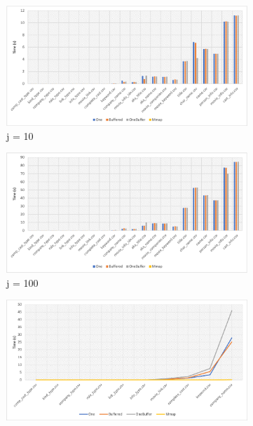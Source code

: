 \documentclass[12pt]{article}
\begin{document}
\begin{figure}[H] 
\begin{adjustwidth}{-3.5cm}{-3.5cm}
  \begin{subfigure}[b]{0.5\linewidth}
    \centering
    \includegraphics[width=0.99\linewidth]{images/randjump-10.png} 
    \caption{j = 10} 
    \label{fig:4a} 
    \vspace{4ex}
  \end{subfigure}%
  \begin{subfigure}[b]{0.5\linewidth}
    \centering
    \includegraphics[width=0.99\linewidth]{images/randjump-100.png} 
    \caption{j = 100} 
    \label{fig:4b} 
    \vspace{4ex}
  \end{subfigure} 
  \begin{subfigure}[b]{0.5\linewidth}
    \centering
    \includegraphics[width=0.99\linewidth]{images/randjump-1000.png} 

\end{subfigure}
\end{adjustwidth}
\end{figure}
\end{document}

